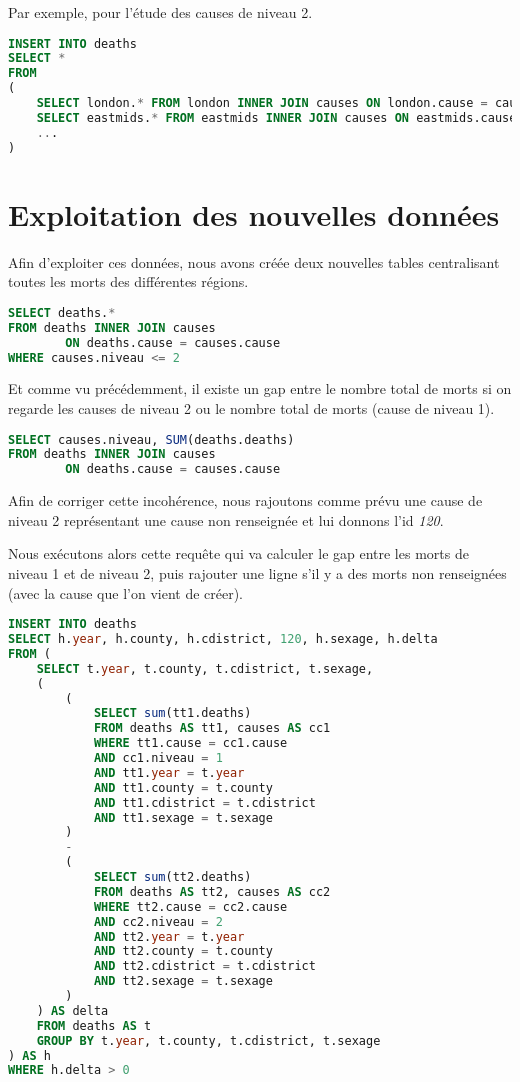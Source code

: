     Par exemple, pour l'étude des causes de niveau 2.

    \begin{lstlisting}[frame=single, language=SQL]
INSERT INTO deaths
SELECT *
FROM
(
    SELECT london.* FROM london INNER JOIN causes ON london.cause = causes.cause WHERE causes.niveau <= 2 UNION
    SELECT eastmids.* FROM eastmids INNER JOIN causes ON eastmids.cause = causes.cause WHERE causes.niveau <= 2 UNION
    ...
)
    \end{lstlisting}


\section{Exploitation des nouvelles données}

    Afin d'exploiter ces données, nous avons créée deux nouvelles tables centralisant toutes les morts des différentes régions.

    \begin{lstlisting}[frame=single, language=SQL]
SELECT deaths.*
FROM deaths INNER JOIN causes
        ON deaths.cause = causes.cause
WHERE causes.niveau <= 2
    \end{lstlisting}

    Et comme vu précédemment, il existe un gap entre le nombre total de morts si on regarde les causes de niveau 2 ou le nombre
    total de morts (cause de niveau 1).

    \begin{lstlisting}[frame=single, language=SQL]
SELECT causes.niveau, SUM(deaths.deaths)
FROM deaths INNER JOIN causes
        ON deaths.cause = causes.cause
    \end{lstlisting}

    Afin de corriger cette incohérence, nous rajoutons comme prévu une cause de niveau 2 représentant une cause non renseignée
    et lui donnons l'id \textit{120}.

    Nous exécutons alors cette requête qui va calculer le gap entre les morts de niveau 1 et de niveau 2, puis rajouter une ligne
    s'il y a des morts non renseignées (avec la cause que l'on vient de créer).

    \begin{lstlisting}[frame=single, language=SQL]
INSERT INTO deaths
SELECT h.year, h.county, h.cdistrict, 120, h.sexage, h.delta
FROM (
    SELECT t.year, t.county, t.cdistrict, t.sexage,
    (
        (
            SELECT sum(tt1.deaths)
            FROM deaths AS tt1, causes AS cc1
            WHERE tt1.cause = cc1.cause
            AND cc1.niveau = 1
            AND tt1.year = t.year
            AND tt1.county = t.county
            AND tt1.cdistrict = t.cdistrict
            AND tt1.sexage = t.sexage
        )
        -
        (
            SELECT sum(tt2.deaths)
            FROM deaths AS tt2, causes AS cc2
            WHERE tt2.cause = cc2.cause
            AND cc2.niveau = 2
            AND tt2.year = t.year
            AND tt2.county = t.county
            AND tt2.cdistrict = t.cdistrict
            AND tt2.sexage = t.sexage
        )
    ) AS delta
    FROM deaths AS t
    GROUP BY t.year, t.county, t.cdistrict, t.sexage
) AS h
WHERE h.delta > 0
    \end{lstlisting}


